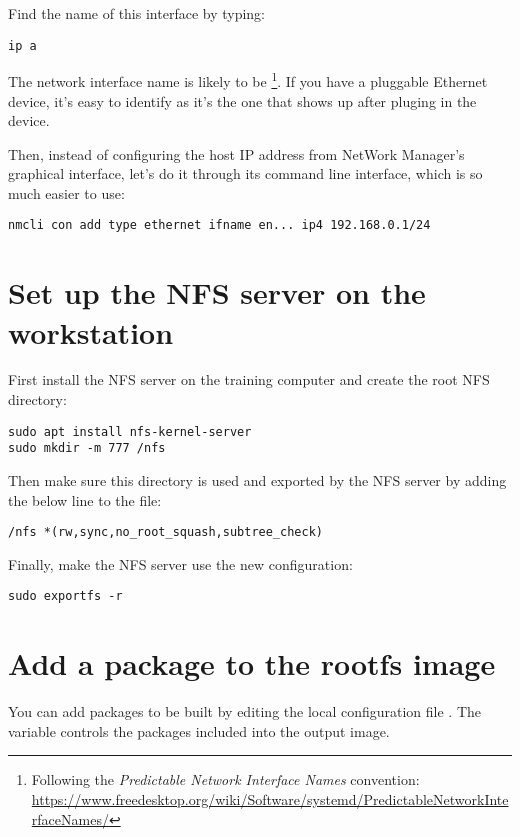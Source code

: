 Find the name of this interface by typing:
\begin{verbatim}
ip a
\end{verbatim}

The network interface name is likely to be
\footnote{Following the {\em Predictable Network Interface
Names} convention:
\url{https://www.freedesktop.org/wiki/Software/systemd/PredictableNetworkInterfaceNames/}}.
If you have a pluggable Ethernet device, it's easy to identify as it's
the one that shows up after pluging in the device.

Then, instead of configuring the host IP address from NetWork Manager’s graphical interface,
let’s do it through its command line interface, which is so much easier to use:

\begin{verbatim}
nmcli con add type ethernet ifname en... ip4 192.168.0.1/24
\end{verbatim}

\section{Set up the NFS server on the workstation}

First install the NFS server on the training computer and create the root NFS
directory:
\begin{verbatim}
sudo apt install nfs-kernel-server
sudo mkdir -m 777 /nfs
\end{verbatim}

Then make sure this directory is used and exported by the NFS server by adding
the below line to the  file:

\begin{verbatim}
/nfs *(rw,sync,no_root_squash,subtree_check)
\end{verbatim}

Finally, make the NFS server use the new configuration:
\begin{verbatim}
sudo exportfs -r
\end{verbatim}

\section{Add a package to the rootfs image}

You can add packages to be built by editing the local configuration file
. The  variable controls the
packages included into the output image.

